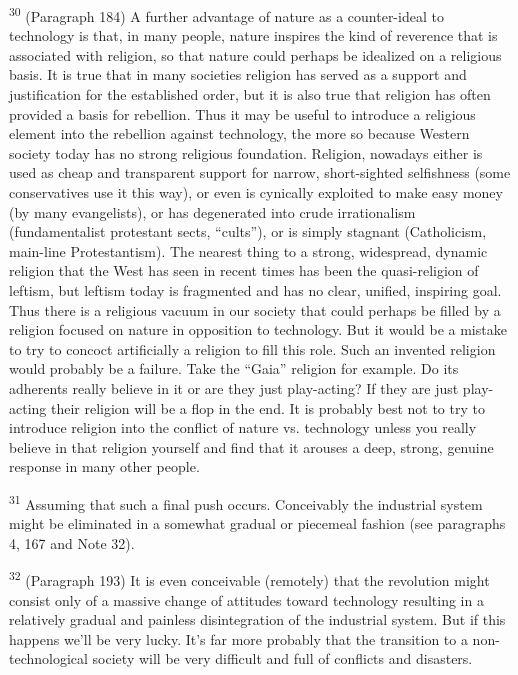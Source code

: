 \documentclass{article}
\begin{document}
\textsuperscript{30} (Paragraph 184) A further advantage of nature as a counter-ideal to technology is that, in many 
people, nature inspires the kind of reverence that is associated with religion, so that nature could 
perhaps be idealized on a religious basis. It is true that in many societies religion has served as a 
support and justification for the established order, but it is also true that religion has often 
provided a basis for rebellion. Thus it may be useful to introduce a religious element into the 
rebellion against technology, the more so because Western society today has no strong religious 
foundation. Religion, nowadays either is used as cheap and transparent support for narrow, 
short-sighted selfishness (some conservatives use it this way), or even is cynically exploited to 
make easy money (by many evangelists), or has degenerated into crude irrationalism 
(fundamentalist protestant sects, “cults”), or is simply stagnant (Catholicism, main-line 
Protestantism). The nearest thing to a strong, widespread, dynamic religion that the West has 
seen in recent times has been the quasi-religion of leftism, but leftism today is fragmented and 
has no clear, unified, inspiring goal. Thus there is a religious vacuum in our society that could 
perhaps be filled by a religion focused on nature in opposition to technology. But it would be a 
mistake to try to concoct artificially a religion to fill this role. Such an invented religion would 
probably be a failure. Take the “Gaia” religion for example. Do its adherents really believe in it 
or are they just play-acting? If they are just play-acting their religion will be a flop in the end. It 
is probably best not to try to introduce religion into the conflict of nature vs. technology unless 
you really believe in that religion yourself and find that it arouses a deep, strong, genuine 
response in many other people. \vspace{\baselineskip} \newpage

\textsuperscript{31} Assuming that such a final push occurs. Conceivably the industrial system might be eliminated 
in a somewhat gradual or piecemeal fashion (see paragraphs 4, 167 and Note 32). \vspace{\baselineskip}

\textsuperscript{32} (Paragraph 193) It is even conceivable (remotely) that the revolution might consist only of a 
massive change of attitudes toward technology resulting in a relatively gradual and painless 
disintegration of the industrial system. But if this happens we’ll be very lucky. It’s far more 
probably that the transition to a non-technological society will be very difficult and full of 
conflicts and disasters. \vspace{\baselineskip}
\end{document}
